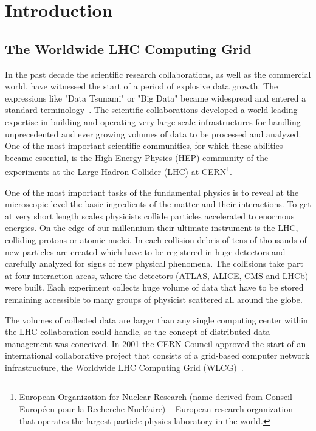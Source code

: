 \chapter*{Introduction}

\section*{The Worldwide LHC Computing Grid}

In the past decade the scientific research collaborations, as well as the
commercial world, have witnessed the start of a  period  of  explosive
data growth. The expressions like "Data Tsunami" or "Big Data" became widespread
and entered a standard terminology~\cite{OSC}. The scientific collaborations developed a
world leading expertise in building and operating very large scale infrastructures for
handling unprecedented and ever growing volumes of data to be processed and analyzed.  
One of the most important scientific communities,
for which these abilities became essential, is the High Energy Physics (HEP) community of 
the experiments at the Large Hadron
Collider (LHC) at CERN\footnote{European Organization for Nuclear Research 
(name derived from Conseil Européen pour la Recherche Nucléaire) -- European research organization that operates 
the largest particle physics laboratory in the world.}.

One of the most important tasks of the fundamental physics is to reveal at the microscopic level the basic 
ingredients of the matter and their interactions. To get at very short length scales physicists collide particles
accelerated to enormous energies. On the edge of our millennium their ultimate instrument is the LHC, colliding protons or 
atomic nuclei. In each 
collision debris of tens of thousands of new particles are created which have to be registered in huge detectors 
and carefully analyzed for signs of new physical phenomena. The collisions take part at four interaction areas, 
where the detectors (ATLAS, ALICE, CMS and LHCb) were built. Each experiment collects huge volume of data that have
to be stored remaining accessible to many groups of physicist scattered all around the globe.

The volumes of collected data are larger than
any single computing center within the LHC collaboration could handle, so the concept of 
distributed data management was conceived. In 2001 the CERN Council approved the start of an international 
collaborative project that consists of a grid-based computer network infrastructure, the Worldwide LHC Computing 
Grid (WLCG)~\cite{happyBday}. 

